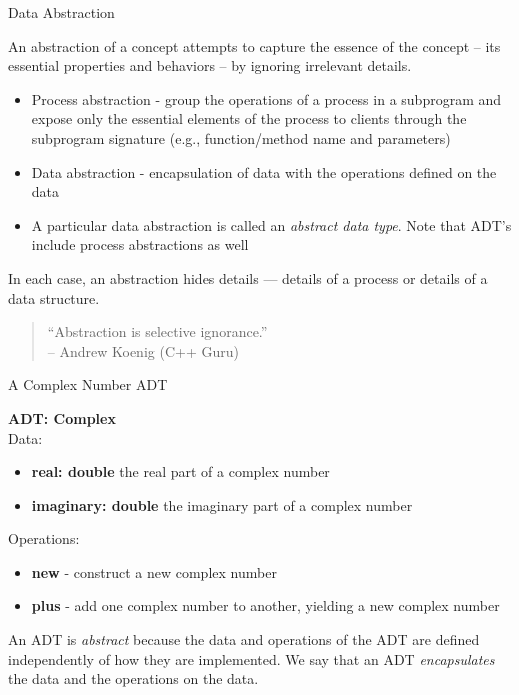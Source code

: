 \documentclass{beamer}
\author[Chris Simpkins]
{Christopher Simpkins \\\texttt{chris.simpkins@gatech.edu}}
\institute[Georgia Tech] %
\date{}
\begin{document}
\begin{frame}
  \titlepage
\end{frame}


\begin{frame}{Data Abstraction}


An abstraction of a concept attempts to capture the essence of the concept -- its essential properties and behaviors -- by ignoring irrelevant details.
\begin{itemize}
\item Process abstraction - group the operations of a process in a subprogram and expose only the essential elements of the process to clients through the subprogram signature (e.g., function/method name and parameters)
\item Data abstraction - encapsulation of data with the operations defined on the data
\item A particular data abstraction is called an {\em abstract data type}.  Note that ADT's include process abstractions as well
\end{itemize}

In each case, an abstraction hides details --- details of a process or details of a data structure.

\begin{quote}
``Abstraction is selective ignorance.''\\
-- Andrew Koenig (C++ Guru)
\end{quote}
\end{frame}

\begin{frame}[fragile]{A Complex Number ADT}


{\bf ADT: Complex}\\
Data:
\begin{itemize}
\item {\bf real: double} the real part of a complex number
\item {\bf imaginary: double} the imaginary part of a complex number
\end{itemize}
Operations:
\begin{itemize}
\item {\bf new} - construct a new complex number
\item {\bf plus} - add one complex number to another, yielding a new complex number
\end{itemize}
An ADT is {\it abstract} because the data and operations of the ADT are defined independently of how they are implemented.  We say that an ADT {\it encapsulates} the data and the operations on the data.

\end{frame}
\end{document}
